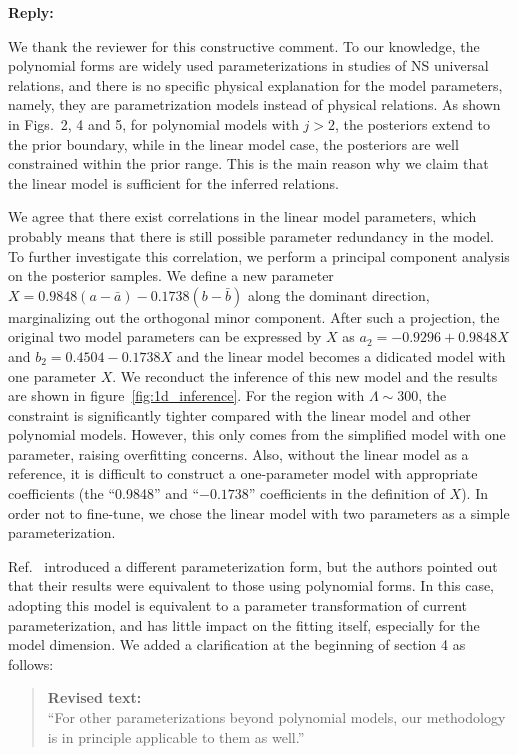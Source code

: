 \documentclass[11pt]{article}
\newenvironment{authorresponse}{
    \noindent \textbf{Reply:} \normalfont
}{
    \par\vspace{1.5em}
}
\newenvironment{revisedtext}{
    \begin{quote}
    \color{revcolor} \small \textbf{Revised text:} \\
}{
    \end{quote}
}
\begin{document}
\begin{authorresponse}
    We thank the reviewer for this constructive comment. To our knowledge, the
    polynomial forms are widely used parameterizations in studies of NS universal relations, and there is no specific physical explanation for the model parameters, namely, they are parametrization models instead of physical relations.
    As shown in Figs.~2, 4 and 5, for polynomial models with $j>2$, the
    posteriors extend to the prior boundary, while in the linear model case, the
    posteriors are well constrained within the prior range. This is the main reason why we claim that the linear model is sufficient for the inferred relations.

    We agree that there exist correlations in the linear model parameters, which probably 
    means that there is still possible parameter redundancy in the model. To further
    investigate this correlation, we perform a principal component analysis on
    the posterior samples. We define a new parameter $X=0.9848(a-\bar{a}) - 0.1738(b-\bar{b})$ along the dominant direction, 
    marginalizing out the orthogonal minor component. After such a projection, the original two model parameters can be 
    expressed by $X$ as $a_2 = -0.9296 + 0.9848 X$ and $b_2 = 0.4504 -0.1738 X$ and the linear model 
    becomes a didicated model with one parameter $X$. 
    We reconduct the inference of this new model and the results are shown in
    figure~\ref{fig:1d_inference}. For the region with $\Lambda \sim 300$, the
    constraint is significantly tighter compared with the linear model and
    other polynomial models. However, this only comes from the simplified model
    with one parameter, raising overfitting concerns. Also, without the linear
    model as a reference, it is difficult to construct a one-parameter model
    with appropriate coefficients (the ``0.9848'' and ``$-0.1738$'' coefficients in the
    definition of $X$). In order not to fine-tune, we chose the linear model with two
    parameters as a simple parameterization.

    Ref.~\cite{Pappas:2013naa} introduced a different parameterization form, but
    the authors pointed out that their results were equivalent to those using
    polynomial forms. In this case, adopting this model is equivalent to a
    parameter transformation of current parameterization, and has little impact
    on the fitting itself, especially for the model dimension. We added a clarification at the 
    beginning of section 4 as follows:

    \begin{revisedtext}
        ``For other parameterizations beyond polynomial models, our methodology is in principle applicable to them as well.''
    \end{revisedtext}
\end{authorresponse}
\end{document}
